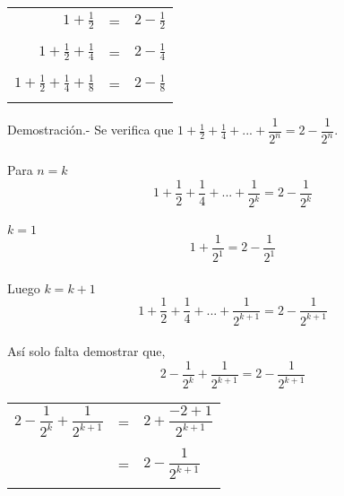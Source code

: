 \begin{enumerate}
\begin{center}
\begin{tabular}{r c l}
$1+\frac{1}{2}$&=&$2-\frac{1}{2}$\\\\
$1+\frac{1}{2}+\frac{1}{4}$&=&$2-\frac{1}{4}$\\\\
$1+\frac{1}{2}+\frac{1}{4}+\frac{1}{8}$&=&$2-\frac{1}{8}$\\\\
\end{tabular}
\end{center}
Demostración.- \; Se verifica que $1+\frac{1}{2}+\frac{1}{4}+...+\dfrac{1}{2^n}=2-\dfrac{1}{2^n}$.\\\\
Para $n=k$ $$1+\frac{1}{2}+\frac{1}{4}+...+\dfrac{1}{2^k}=2-\dfrac{1}{2^k}$$\\
$k=1$ $$1+\dfrac{1}{2^1}=2-\dfrac{1}{2^1}$$\\
Luego $k=k+1$ $$1+\frac{1}{2}+\frac{1}{4}+...+\dfrac{1}{2^{k+1}}=2-\dfrac{1}{2^{k+1}}$$\\
Así solo falta demostrar que, $$2-\dfrac{1}{2^k}+\dfrac{1}{2^{k+1}}=2-\dfrac{1}{2^{k+1}}$$
\begin{center}
\begin{tabular}{r c l}
$2-\dfrac{1}{2^k}+\dfrac{1}{2^{k+1}}$&=&$2+\dfrac{-2+1}{2^{k+1}}$\\\\
&=&$2-\dfrac{1}{2^{k+1}}$\\\\
\end{tabular}
\end{center}


\end{enumerate}
